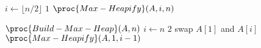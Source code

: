 \begin{codebox}
  \li \For $i \gets \lfloor n / 2 \rfloor$ \Downto $1$ \Do
  \li     $\proc{Max-Heapify}(A, i, n)$
      \End
\end{codebox}

\begin{codebox}
  \li $\proc{Build-Max-Heap}(A, n)$
  \li \For $i \gets n$ \Downto $2$ \Do
  \li     swap $A[1]$ and $A[i]$
  \li     $\proc{Max-Heapify}(A, 1, i - 1)$
      \End
\end{codebox}